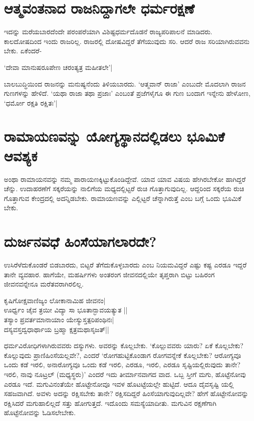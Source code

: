\section*{ಆತ್ಮವಂತನಾದ ರಾಜನಿದ್ದಾಗಲೇ ಧರ್ಮರಕ್ಷಣೆ}

ಇದನ್ನು ಮರೆಯಬಾರದೆಂದೇ ಪರಂಪರೆಯಾಗಿ ವಿಶಿಷ್ಟಧರ್ಮದೊಡನೆ ರಾಜ್ಯಪರಿಪಾಲನೆ ಮಾಡಿದರು. ಕಾಲದೋಷದಿಂದ ಇಂದು ರಾಜರಿಲ್ಲ. ರಾಜರಲ್ಲಿ ದೋಷವಿದ್ದರೆ ತೆಗೆಯುವುದು ಸರಿ. ಆದರೆ ರಾಜ ಸರಿಯಾಗಿರುವವನು ಬೇಕು. ಏಕೆಂದರೆ-

\begin{shloka}
`ದೇವಾ ಮಾನುಷರೂಪೇಣ ಚರಂತ್ಯತ್ರ ಮಹೀತಲೇ'|\label{225}
\end{shloka}

ಬಾಲಬುದ್ಧಿಯಿಂದ ರಾಜನನ್ನು ಮನುಷ್ಯನೆಂದು ತಿಳಿಯಬಾರದು. `ಆತ್ಮವಾನ್ ರಾಜಾ' ಎಂಬುದೇ ಮೊದಲಾಗಿ ರಾಜನ ಗುಣಗಳನ್ನು ಹೇಳಿದೆ. `ಯಥಾ ರಾಜಾ ತಥಾ ಪ್ರಜಾಃ'\label{225c} ಎಂಬಂತೆ ಪ್ರಜೆಗಳೈಗೂ ಈ ಗುಣ ಬಂದಾಗ ಇನ್ನೇನು ಹೇಳೋಣ, `ಧರ್ಮೋ ರಕ್ಷತಿ ರಕ್ಷಿತಃ'|\label{225}

\section*{ರಾಮಾಯಣವನ್ನು ಯೋಗ್ಯಸ್ಥಾನದಲ್ಲಿಡಲು ಭೂಮಿಕೆ ಆವಶ್ಯಕ}

ಅಂಥಾ ರಾಮಾಯನವನ್ನು ನಮ್ಮ ಪಾರಾಯಣಕ್ಕಿಟ್ಟುಕೊಂಡಿದ್ದೇವೆ. ಯಾವ ಯಾವ ವಿಷಯ ಹೇಗಿರಬೇಕೋ ಹಾಗಿದ್ದರೆ ಚೆನ್ನು. ಉದಾಹರಣೆಗೆ ಸಕ್ಕರೆಯನ್ನು ನಾಲಿಗೆಯ ಮಧ್ಯದಲ್ಲಿಟ್ಟರೆ ರುಚಿ ಗೊತ್ತಾಗುವುದಿಲ್ಲ. ಆದ್ದರಿಂದ ಸಕ್ಕರೆಯ ರುಚಿ ಗೊತ್ತಾಗುವ ಕೇಂದ್ರದಲ್ಲಿ ಅದನ್ನಿಡಬೇಕು. ರಾಮಾಯಣವನ್ನು ಎಲ್ಲಿಟ್ಟರೆ ಚೆನ್ನಾಗಿರುತ್ತೆ ಎಂಬ ಬಗ್ಗೆ ಒಂದು ಭೂಮಿಕೆ ಬೇಕು.

\section*{ದುರ್ಜನವಧೆ ಹಿಂಸೆಯಾಗಲಾರದೇ?}

ಉಸಿರೆಳೆದುಕೊಂಡರೆ ಬಿಡಬಾರದು, ಬಿಟ್ಟರೆ ತೆಗೆದುಕೊಳ್ಳಬಾರದು ಎಂಬ ನಿಯಮವಿದ್ದರೆ ಎಷ್ಟು ಕಷ್ಟ ಎರಡೂ ಇದ್ದರೆ ತಾನೇ ವ್ಯವಹಾರ. ಹಾಗೆಯೇ, ಮಹರ್ಷಿಗಳು ಅಂತರಂಗ ಜೀವನದಲ್ಲಿಯೇ ತೃಪ್ತರಾಗಿ ಬಿಟ್ಟು ಬಹಿರಂಗ ಜೀವನವನ್ನೇನೂ ಮರೆತವರಾಗಿರಲಿಲ್ಲ.

\begin{shloka}
ಕೃಷಿಗೋಕ್ಷವಾಣಿಜ್ಯಂ ಲೋಕಾನಾಮಿಹ ಜೀವನಂ|\label{225}\\
ಊರ್ಧ್ವಂ ಚೈವ ತ್ರಯೀ ವಿದ್ಯಾ ಸಾ‌ ಭೂತಾನ್ಭಾವಯತ್ಯುತ ||\\
ತಸ್ಯಾಂ ಪ್ರವರ್ತಮಾನಾಯಾಂ ಯೇಸ್ಯುಸ್ತತ್ಪರಿಪಂಥಿನಃ|\\
ದಸ್ಯವಸ್ತದ್ವಧಾರ್ಥಾಯ ಬ್ರಹ್ಮಾ ಕ್ಷತ್ರಮಥಾಸೃಜತ್||
\end{shloka}
ಧರ್ಮವಿರೋಧಿಗಳಾಗಿರುವವರು ದಸ್ಯುಗಳು. ಅವರನ್ನು ಕೊಲ್ಲಬೇಕು. `ಕೊಲ್ಲುವವರು ಯಾರು? ಏಕೆ ಕೊಲ್ಲಬೇಕು? ಕೊಲ್ಲುವುದು ಪ್ರಾಣಿಹಿಂಸೆಯಲ್ಲವೇ?, ಎಂದರೆ `ರೋಗಹುಟ್ಟಿಕೊಂಡಾಗ ರೋಗವನ್ನೇಕೆ ಕೊಲ್ಲಬೇಕು? ಆರೋಗ್ಯವೂ ಒಂದು ಕಡೆ ಇರಲಿ, ಅನಾರೋಗ್ಯವೂ ಒಂದು ಕಡೆ ಇರಲಿ, ಎರಡೂ, ಇರಲಿ, ಎರಡೂ ಸೃಷ್ಟಿಯಲ್ಲಿರುವುದು ತಾನೇ? ಇರಲಿ, ನಾವು ನೂಟ್ರಲ್ (ಮಧ್ಯಸ್ಥರು)' ಎಂದರೆ ಇದು ತೀರ್ಮಾನವಾಗದ ವಾದ. ಒಬ್ಬ ಸ್ತೀಗೆ ಮಗು, ಹೊಟ್ಟೆನೋವು ಎರಡೂ ಇದೆ. ಮಗುವಿನಂತೆಯೇ ಹೊಟ್ಟೇನೋವೂ ಇವಳ ಹೊಟಟ್ಟೆಯಲ್ಲೇ ಹುಟ್ಟಿದೆ. ಆದೂ ದೈವಸೃಷ್ಟಿ ಯಲ್ಲಿ ಸಹಜವಾಗಿದೆ. ಅವಳು ಅದನ್ನು ರಕ್ಷಿಸಬೇಕು ತಾನೇ? ರಕ್ಷಿಸದಿದ್ದರೆ ಹಿಂಸೆಯಾಗುವುದಿಲ್ಲವೇ? ಹೇಗೆ ಹೊಟ್ಟೇನೋವನ್ನು ರಕ್ಷಿಸಿದರೆ ಮಗುಹಾಲಿಲ್ಲದೆ ಸತ್ತು ಹೋಗುತ್ತದೆ. ಇದೊಂದು ಸಮಸ್ಯೆಯಾದೀತು. ಮಗುವಿನ ರಕ್ಷಣೆಗಾಗಿ ಹೊಟ್ಟೆನೋವನ್ನು ಓಡಿಸಲೇಬೇಕು.

